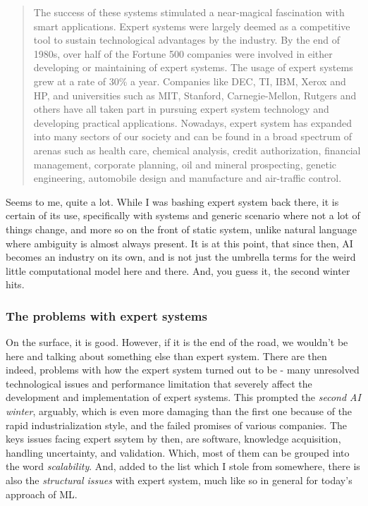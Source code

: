\begin{quote}
    The success of these systems stimulated a near-magical fascination with smart applications. Expert systems were largely deemed as a competitive tool to sustain technological advantages by the industry. By the end of 1980s, over half of the Fortune 500 companies were involved in either developing or maintaining of expert systems. The usage of expert systems grew at a rate of 30\% a year. Companies like DEC, TI, IBM, Xerox and HP, and universities such as MIT, Stanford, Carnegie-Mellon, Rutgers and others have all taken part in pursuing expert system technology and developing practical applications. Nowadays, expert system has expanded into many sectors of our society and can be found in a broad spectrum of arenas such as health care, chemical analysis, credit authorization, financial management, corporate planning, oil and mineral prospecting, genetic engineering, automobile design and manufacture and air-traffic control.
\end{quote}

Seems to me, quite a lot. While I was bashing expert system back there, it is certain of its use, specifically with systems and generic scenario where not a lot of things change, and more so on the front of static system, unlike natural language where ambiguity is almost always present. It is at this point, that since then, AI becomes an industry on its own, and is not just the umbrella terms for the weird little computational model here and there. And, you guess it, the second winter hits.
\subsubsection{The problems with expert systems}
On the surface, it is good. However, if it is the end of the road, we wouldn't be here and talking about something else than expert system. There are then indeed, problems with how the expert system turned out to be - many unresolved technological issues and performance limitation that severely affect the development and implementation of expert systems. This prompted the \textit{second AI winter}, arguably, which is even more damaging than the first one because of the rapid industrialization style, and the failed promises of various companies. The keys issues facing expert ssytem by then, are software, knowledge acquisition, handling uncertainty, and validation. Which, most of them can be grouped into the word \textit{scalability}. And, added to the list which I stole from somewhere, there is also the \textit{structural issues} with expert system, much like so in general for today's approach of ML. 

